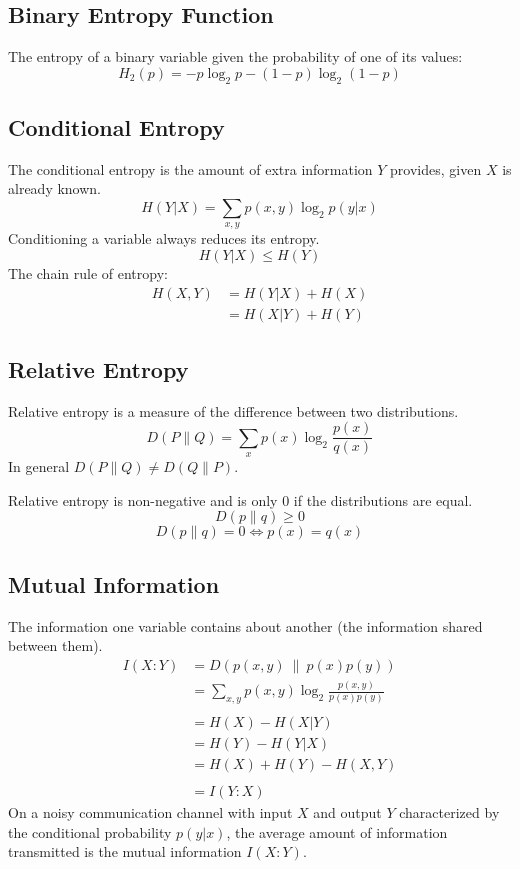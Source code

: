\documentclass[a4paper,12pt,DIV=calc]{scrartcl}
\begin{document}
\subsection{Binary Entropy Function}
The entropy of a binary variable given the probability of one of its values:
\[H_2(p) = -p\log_2 p -(1 - p)\log_2 (1 - p)\]

\subsection{Conditional Entropy}
The conditional entropy is the amount of extra information $Y$ provides, given
$X$ is already known.
\[H(Y|X) = \sum_{x,y} p(x, y)\log_2 p(y|x)\]
Conditioning a variable always reduces its entropy.
\[H(Y|X) \leq H(Y)\]
The chain rule of entropy:
\begin{align*}
  H(X, Y) &= H(Y|X) + H(X) \\
          &= H(X|Y) + H(Y)
\end{align*}

\subsection{Relative Entropy}
Relative entropy is a measure of the difference between two distributions.
\[D(P\|Q) = \sum_x p(x) \log_2 \frac{p(x)}{q(x)}\]
In general $D(P\|Q) \neq D(Q\|P)$.

Relative entropy is non-negative and is only 0 if the distributions are equal.
\[D(p\|q) \geq 0\]
\[D(p\|q) = 0 \Leftrightarrow p(x) = q(x)\]

\subsection{Mutual Information}
The information one variable contains about another (the information shared
between them).
\begin{align*}
  I(X:Y) &= D(p(x,y)~\|~p(x)p(y)) \\
         &= \sum_{x,y} p(x,y) \log_2 \frac{p(x,y)}{p(x)p(y)} \\\\
         &= H(X) - H(X|Y) \\
         &= H(Y) - H(Y|X) \\
         &= H(X) + H(Y) - H(X,Y) \\\\
         &= I(Y:X)
\end{align*}
On a noisy communication channel with input $X$ and output $Y$ characterized by
the conditional probability $p(y|x)$, the average amount of information
transmitted is the mutual information $I(X:Y)$.
\end{document}
